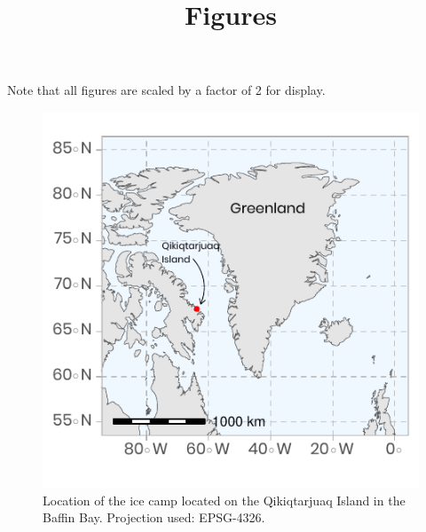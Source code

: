 \documentclass[12pt,a4paper]{scrartcl}
\title{Figures}
\date{}
\begin{document}
\maketitle

Note that all figures are scaled by a factor of 2 for display.

\begin{figure}[h]
	\centering
	\includegraphics[scale = 2]{../../../graphs/fig1.pdf}
	\caption{Location of the ice camp located on the Qikiqtarjuaq Island in the Baffin Bay. Projection used: EPSG-4326.}
\end{figure}

\clearpage
\newpage
\end{document}
